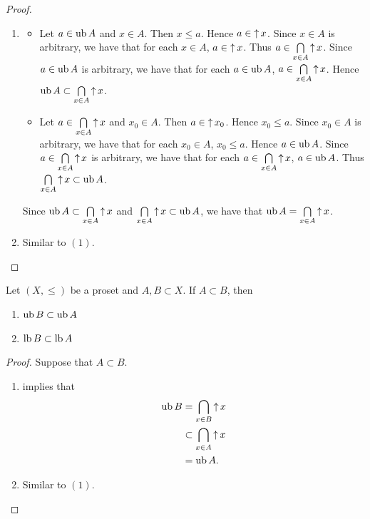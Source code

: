 \documentclass{book}
\begin{document}
	\begin{proof}\
		\begin{enumerate}
			\item 
			\begin{itemize}
				\item Let $a \in \operatorname{ub} A$ and $x \in A$. Then $x \leq a$. Hence $a \in \operatorname{\uparrow} x$. Since $x \in A$ is arbitrary, we have that for each $x \in A$, $a \in \operatorname{\uparrow} x$. Thus $a \in \bigcap\limits_{x \in A} \operatorname{\uparrow} x$. Since $a \in \operatorname{ub} A$ is arbitrary, we have that for each $a \in \operatorname{ub} A$, $a \in \bigcap\limits_{x \in A} \operatorname{\uparrow} x$. Hence $\operatorname{ub} A \subset \bigcap\limits_{x \in A} \operatorname{\uparrow} x$.  
				\item Let $a \in \bigcap\limits_{x \in A} \operatorname{\uparrow} x$ and $x_0 \in A$. Then $a \in \operatorname{\uparrow} x_0$. Hence $x_0 \leq a$. Since $x_0 \in A$ is arbitrary, we have that for each $x_0 \in A$, $x_0 \leq a$. Hence $a \in \operatorname{ub} A$. Since $a \in \bigcap\limits_{x \in A} \operatorname{\uparrow} x$ is arbitrary, we have that for each $a \in \bigcap\limits_{x \in A} \operatorname{\uparrow} x$, $a \in \operatorname{ub} A$. Thus $\bigcap\limits_{x \in A} \operatorname{\uparrow} x \subset \operatorname{ub} A$.
			\end{itemize}
			Since $\operatorname{ub} A \subset \bigcap\limits_{x \in A} \operatorname{\uparrow} x$ and $\bigcap\limits_{x \in A} \operatorname{\uparrow} x \subset \operatorname{ub} A$, we have that $\operatorname{ub} A = \bigcap\limits_{x \in A} \operatorname{\uparrow} x$.
			\item Similar to $(1)$.
		\end{enumerate}
	\end{proof}
	
	\begin{ex} 
		Let $(X, \leq)$ be a proset and $A, B \subset X$. If $A \subset B$, then 
		\begin{enumerate}
			\item $\operatorname{ub} B \subset \operatorname{ub} A$
			\item $\operatorname{lb} B \subset \operatorname{lb} A$
		\end{enumerate}
	\end{ex}
	
	\begin{proof}
		Suppose that $A \subset B$. 
		\begin{enumerate}
			\item {} implies that
			\begin{align*}
				\operatorname{ub} B
				& = \bigcap\limits_{x \in B} \operatorname{\uparrow} x \\
				& \subset \bigcap\limits_{x \in A} \operatorname{\uparrow} x \\
				& = \operatorname{ub} A.
			\end{align*}
			\item Similar to $(1)$. 
		\end{enumerate}
	\end{proof}
	
\end{document}
